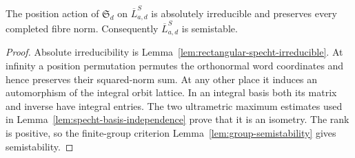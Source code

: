 \begin{lemma}
\label{lem:specht-semistability}
\leanok
The position action of $\mathfrak S_d$ on $\overline L^S_{a,d}$ is
absolutely irreducible and preserves every completed fibre norm.
Consequently $\overline L^S_{a,d}$ is semistable.
\end{lemma}
\begin{proof}
Absolute irreducibility is Lemma~\ref{lem:rectangular-specht-irreducible}.
At infinity a position permutation permutes the orthonormal word
coordinates and hence preserves their squared-norm sum. At any other
place it induces an automorphism of the integral orbit lattice. In an
integral basis both its matrix and inverse have integral entries. The
two ultrametric maximum estimates used in
Lemma~\ref{lem:specht-basis-independence} prove that it is an isometry.
The rank is positive, so the finite-group criterion
Lemma~\ref{lem:group-semistability} gives semistability.
\end{proof}

